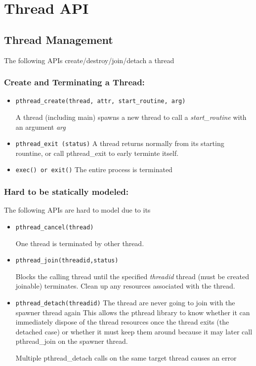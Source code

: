 
\section{Thread API}
\subsection{Thread Management}
The following APIs create/destroy/join/detach a thread
\subsubsection{Create and Terminating a Thread:}

\begin{itemize}
\item \texttt{pthread\_create(thread, attr, start\_routine, arg)}

A thread (including main) spawns a new thread to call a \emph{start\_routine}
with an argument \emph{arg}

\item \texttt{pthread\_exit (status)}
A thread returns normally from its starting rountine, or call pthread\_exit to
early terminte itself.

\item \texttt{exec() or exit()}
The entire process is terminated
 
\end{itemize}


\subsubsection{Hard to be statically modeled:} 
The following APIs are hard to model due to its

\begin{itemize}
  \item \texttt{pthread\_cancel(thread)}

  One thread is terminated by other thread.
 
  \item \texttt{pthread\_join(threadid,status)}
 
  Blocks the calling thread until the specified \emph{threadid} thread (must be
  created joinable) terminates. Clean up any resources associated with the
  thread.

  \item \texttt{pthread\_detach(threadid)}
  The thread are never going to join with the spawner thread again
  This allows the pthread library to know whether it can immediately
  dispose of the thread resources once the thread exits (the detached case) or 
  whether it must keep them around because it may later call pthread\_join on
  the spawner thread.
  
  Multiple pthread\_detach calls on the same target thread causes
  an error
 
\end{itemize}


